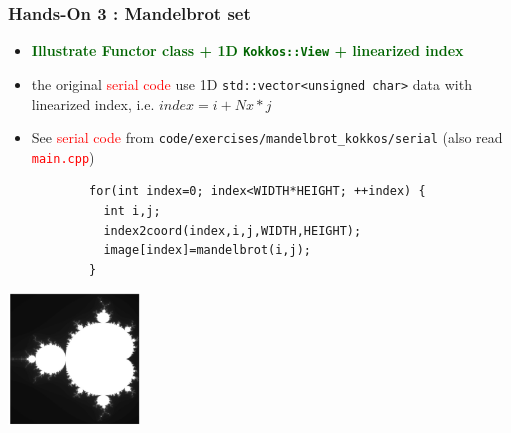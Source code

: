 \begin{frame}[fragile=singleslide]
  \frametitle{Hands-On 3 : Mandelbrot set}

  \begin{itemize}
  \item \textcolor{darkgreen}{\textbf{Illustrate Functor class + 1D \texttt{Kokkos::View} + linearized index}}
  \item the original \textcolor{red}{serial code} use 1D \texttt{std::vector<unsigned char>} data with linearized index, i.e. $index = i + Nx * j$
  \item See \textcolor{red}{serial code} from \texttt{code/exercises/mandelbrot\_kokkos/serial} (also read \textcolor{red}{\texttt{main.cpp}})
    {\small
      \begin{verbatim}
        for(int index=0; index<WIDTH*HEIGHT; ++index) {
          int i,j;
          index2coord(index,i,j,WIDTH,HEIGHT);
          image[index]=mandelbrot(i,j);
        }
      \end{verbatim}
    }
  \end{itemize}

  \begin{center}
    \includegraphics[width=3.5cm]{images/mandelbrot}
  \end{center}
  
\end{frame}


